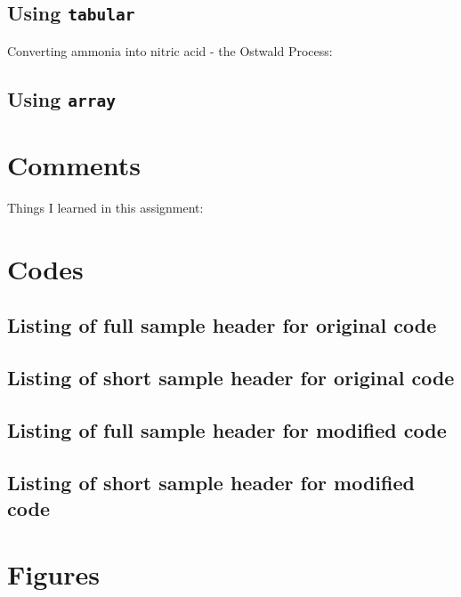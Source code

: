\documentclass{article}
\begin{document}
\subsection{Using {\tt tabular}} %
Converting ammonia into nitric acid - the Ostwald Process\cite{Ostwald}:
\subsection{Using {\tt array}} %
\pagebreak

\section{Comments} %
Things I learned in this assignment:


\pagebreak
\appendix
\section{Codes}
\subsection{Listing of full sample header for original code}

\subsection{Listing of short sample header for original code}

\subsection{Listing of full sample header for modified code}

\subsection{Listing of short sample header for modified code}

\pagebreak
\section{Figures \label{FigureList}}
\end{document}
